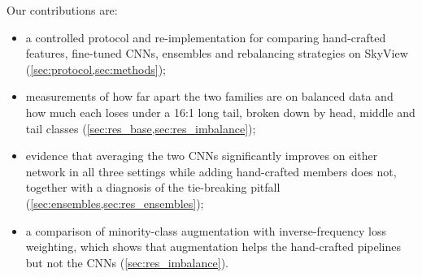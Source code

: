 Our contributions are:
\begin{itemize}
  \item a controlled protocol and re-implementation for comparing hand-crafted features, fine-tuned CNNs, ensembles and rebalancing strategies on SkyView (\cref{sec:protocol,sec:methods});
  \item measurements of how far apart the two families are on balanced data and how much each loses under a 16:1 long tail, broken down by head, middle and tail classes (\cref{sec:res_base,sec:res_imbalance});
  \item evidence that averaging the two CNNs significantly improves on either network in all three settings while adding hand-crafted members does not, together with a diagnosis of the tie-breaking pitfall (\cref{sec:ensembles,sec:res_ensembles});
  \item a comparison of minority-class augmentation with inverse-frequency loss weighting, which shows that augmentation helps the hand-crafted pipelines but not the CNNs (\cref{sec:res_imbalance}).
\end{itemize}
